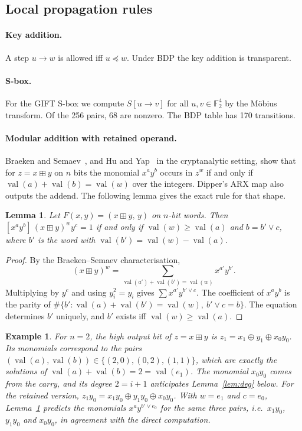 \documentclass[pdflatex,sn-mathphys-num]{sn-jnl}
\theoremstyle{thmstyleone}
\newtheorem{lemma}{Lemma}
\theoremstyle{thmstylethree}
\theoremstyle{thmstyletwo}
\newtheorem{example}{Example}
\newcommand{\modadd}{\boxplus}
\newcommand{\Ftwo}{\mathbb{F}_2}
\newcommand{\intval}{\operatorname{val}}
\begin{document}
\subsection{Local propagation rules}

\paragraph{Key addition.} A step $u\to w$ is allowed iff $u\preceq w$. Under BDP the key addition is transparent.

\paragraph{S-box.} For the GIFT S-box we compute $S[u\to v]$ for all $u,v\in\Ftwo^4$ by the Möbius transform. Of the 256 pairs, 68 are nonzero. The BDP table has 170 transitions.

\paragraph{Modular addition with retained operand.} Braeken and Semaev~\cite{braeken2005}, and Hu and Yap~\cite{huyap2024} in the cryptanalytic setting, show that for $z=x\modadd y$ on $n$ bits the monomial $x^ay^b$ occurs in $z^w$ if and only if $\intval(a)+\intval(b)=\intval(w)$ over the integers. Dipper's ARX map also outputs the addend. The following lemma gives the exact rule for that shape.

\begin{lemma}\label{lem:addret}
Let $F(x,y)=(x\modadd y,\,y)$ on $n$-bit words. Then $[x^a y^b]\,(x\modadd y)^w y^c = 1$ if and only if $\intval(w)\ge\intval(a)$ and $b = b'\vee c$, where $b'$ is the word with $\intval(b')=\intval(w)-\intval(a)$.
\end{lemma}
\begin{proof}
By the Braeken--Semaev characterisation, \[(x\modadd y)^w=\sum_{\intval(a')+\intval(b')=\intval(w)}x^{a'}y^{b'}.\] Multiplying by $y^c$ and using $y_i^2=y_i$ gives $\sum x^{a'}y^{b'\vee c}$. The coefficient of $x^ay^b$ is the parity of $\#\{b' : \intval(a)+\intval(b')=\intval(w),\ b'\vee c=b\}$. The equation determines $b'$ uniquely, and $b'$ exists iff $\intval(w)\ge\intval(a)$.
\end{proof}


\begin{example}\label{ex:add}
For $n=2$, the high output bit of $z=x\modadd y$ is $z_1=x_1\oplus y_1\oplus x_0y_0$. Its monomials correspond to the pairs $(\intval(a),\intval(b))\in\{(2,0),(0,2),(1,1)\}$, which are exactly the solutions of $\intval(a)+\intval(b)=2=\intval(e_1)$. The monomial $x_0y_0$ comes from the carry, and its degree $2=i+1$ anticipates Lemma~\ref{lem:deg} below. For the retained version, $z_1y_0=x_1y_0\oplus y_1y_0\oplus x_0y_0$. With $w=e_1$ and $c=e_0$, Lemma~\ref{lem:addret} predicts the monomials $x^ay^{b'\vee e_0}$ for the same three pairs, i.e.\ $x_1y_0$, $y_1y_0$ and $x_0y_0$, in agreement with the direct computation.
\end{example}
\end{document}
